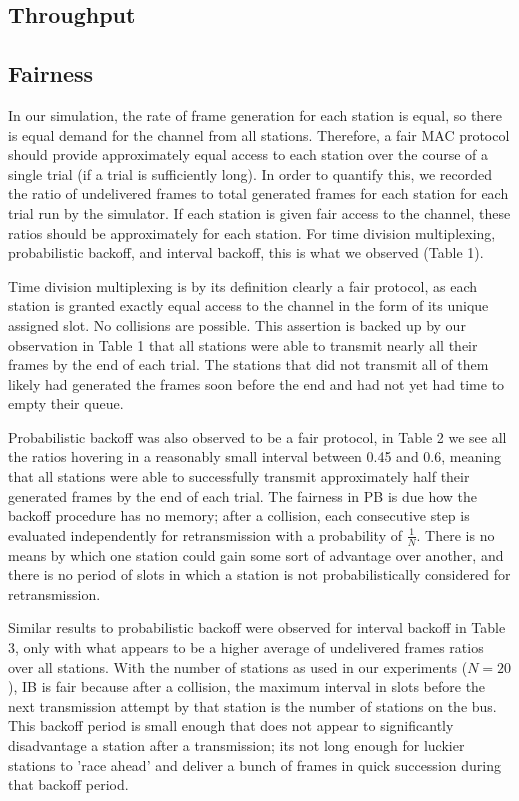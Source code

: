 \documentclass[twocolumn]{article}
\begin{document}
\subsection*{Throughput}

\subsection*{Fairness} 

In our simulation, the rate of frame generation for each station is equal, so there is
equal demand for the channel from all stations. Therefore, a fair MAC protocol should provide
approximately equal access to each station over the course of a single trial (if a trial is
sufficiently long). In order to quantify this, we recorded the ratio of undelivered frames
to total generated frames for each station for each trial run by the simulator. If each station
is given fair access to the channel, these ratios should be approximately for each station. For
time division multiplexing, probabilistic backoff, and interval backoff, this is what we 
observed (Table 1).

Time division multiplexing is by its definition clearly a fair protocol, as each station is 
granted exactly equal access to the channel in the form of its unique assigned slot. No 
collisions are possible. This assertion is backed up by our observation in Table 1 that 
all stations were able to transmit nearly all their frames by the end of each trial. The 
stations that did not transmit all of them likely had generated the frames soon before the 
end and had not yet had time to empty their queue.

Probabilistic backoff was also observed to be a fair protocol, in Table 2 we see all the 
ratios hovering in a reasonably small interval between 0.45 and 0.6, meaning that all stations
were able to successfully transmit approximately half their generated frames by the end of each
trial. The fairness in PB is due how the backoff procedure has no memory; after a collision,
each consecutive step is evaluated independently for retransmission with a probability of 
$\frac{1}{N}$. There is no means by which one station could gain some sort of advantage over
another, and there is no period of slots in which a station is not probabilistically considered
for retransmission.

Similar results to probabilistic backoff were observed for interval backoff in Table 3, only 
with what appears to be a higher average of undelivered frames ratios over all stations. With
the number of stations as used in our experiments ($N=20$), IB is fair because
after a collision, the maximum interval in slots before the next transmission
attempt by that station is the number of stations on the bus. This backoff period is 
small enough that does not appear to significantly disadvantage a station after a transmission;
its not long enough for luckier stations to 'race ahead' and deliver a bunch of frames in 
quick succession during that backoff period.
\end{document}

